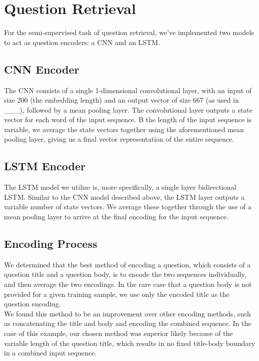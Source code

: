 \documentclass[12pt]{article}
\begin{document}
\section{Question Retrieval}
For the semi-supervised task of question retrieval, we've implemented two models to act as question encoders: a CNN and an LSTM.

\subsection{CNN Encoder}
The CNN consists of a single 1-dimensional convolutional layer, with an input of size 200 (the embedding length) and an output vector of size 667 (as used in \_\_\_), followed by a mean pooling layer. The convolutional layer outputs a state vector for each word of the input sequence. B the length of the input sequence is variable, we average the state vectors together using the aforementioned mean pooling layer, giving us a final vector representation of the entire sequence.

\subsection{LSTM Encoder}
The LSTM model we utilize is, more specifically, a single layer bidirectional LSTM. Similar to the CNN model described above, the LSTM layer outputs a variable number of state vectors. We average these together through the use of a mean pooling layer to arrive at the final encoding for the input sequence.

\subsection{Encoding Process}
We determined that the best method of encoding a question, which consists of a question title and a question body, is to encode the two sequences individually, and then average the two encodings. In the rare case that a question body is not provided for a given training sample, we use only the encoded title as the question encoding.\\

We found this method to be an improvement over other encoding methods, such as concatenating the title and body and encoding the combined sequence. In the case of this example, our chosen method was superior likely because of the variable length of the question title, which results in no fixed title-body boundary in a combined input sequence.\\
\end{document}
